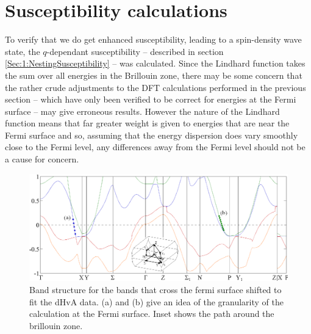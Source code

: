 
\section{Susceptibility calculations}
    \label{Sec:ResD:SubsceptibilityCalculation}

To verify that we do get enhanced susceptibility, leading to a spin-density wave state, the $q$-dependant susceptibility -- described in section \ref{Sec:1:NestingSusceptibility} -- was calculated. Since the Lindhard function takes the sum over all energies in the Brillouin zone, there may be some concern that the rather crude adjustments to the DFT calculations performed in the previous section -- which have only been verified to be correct for energies at the Fermi surface -- may give erroneous results. However the nature of the Lindhard function means that far greater weight is given to energies that are near the Fermi surface and so, assuming that the energy dispersion does vary smoothly close to the Fermi level, any differences away from the Fermi level should not be a cause for concern.  
\begin{figure}[htbp]
    \begin{center}
        \includegraphics[scale=0.9]{Chapter-dHvABaFe2P2/Figures/AngleDepMeasurements/ShiftedBandStructure/ShiftedBandStructure}
        \caption{Band structure for the bands that cross the fermi surface shifted to fit the dHvA data. (a) and (b) give an idea of the granularity of the \WIEN calculation at the Fermi surface. Inset shows the path around the brillouin zone.}
        \label{Fig:ResD:ShiftedBandStructure}
    \end{center}
\end{figure}
